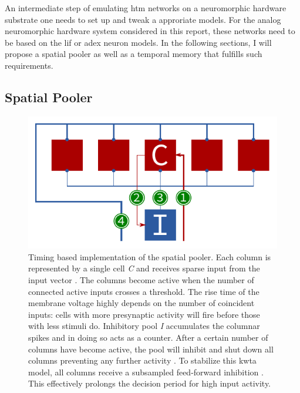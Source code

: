An intermediate step of emulating \gls{htm} networks on a neuromorphic hardware substrate one needs to set up and tweak a approriate models. For the analog neuromorphic hardware system considered in this report, these networks need to be based on the \gls{lif} or \gls{adex} neuron models. In the following sections, I will propose a spatial pooler as well as a temporal memory that fulfills such requirements.


\subsection{Spatial Pooler}
\label{sss:spatial_pooler_network}

\begin{figure}
	\begin{center}
		\includegraphics{../circuitry/spatial_pooler.pdf}
	\end{center}
	\caption{Timing based implementation of the spatial pooler. Each column is represented by a single cell \emph{C} and receives sparse input from the input vector \protect{}. The columns become active when the number of connected active inputs crosses a threshold. The rise time of the membrane voltage highly depends on the number of coincident inputs: cells with more presynaptic activity will fire before those with less stimuli do. Inhibitory pool \emph{I} accumulates the columnar spikes \protect{} and in doing so acts as a counter. After a certain number of columns have become active, the pool will inhibit and shut down all columns preventing any further activity \protect{}. To stabilize this \gls{kwta} model, all columns receive a subsampled feed-forward inhibition \protect{}. This effectively prolongs the decision period for high input activity.}
	\label{fig:spatial_pooler}
\end{figure}

